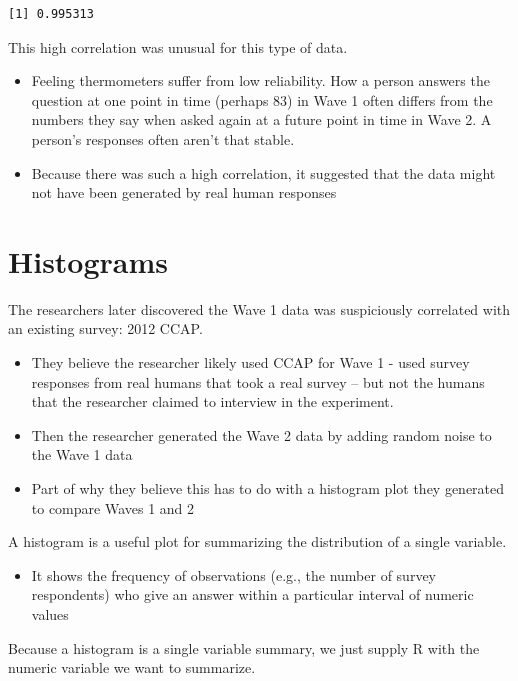\documentclass[
  letterpaper,
  DIV=11,
  numbers=noendperiod]{scrreprt}
\providecommand{\tightlist}{%
  \setlength{\itemsep}{0pt}\setlength{\parskip}{0pt}}\usepackage{longtable,booktabs,array}
\begin{document}
\begin{verbatim}
[1] 0.995313
\end{verbatim}

This high correlation was unusual for this type of data.

\begin{itemize}
\tightlist
\item
  Feeling thermometers suffer from low reliability. How a person answers
  the question at one point in time (perhaps 83) in Wave 1 often differs
  from the numbers they say when asked again at a future point in time
  in Wave 2. A person's responses often aren't that stable.
\item
  Because there was such a high correlation, it suggested that the data
  might not have been generated by real human responses
\end{itemize}

\hypertarget{histograms}{%
\section{Histograms}\label{histograms}}

The researchers later discovered the Wave 1 data was suspiciously
correlated with an existing survey: 2012 CCAP.

\begin{itemize}
\tightlist
\item
  They believe the researcher likely used CCAP for Wave 1 - used survey
  responses from real humans that took a real survey -- but not the
  humans that the researcher claimed to interview in the experiment.
\item
  Then the researcher generated the Wave 2 data by adding random noise
  to the Wave 1 data
\item
  Part of why they believe this has to do with a histogram plot they
  generated to compare Waves 1 and 2
\end{itemize}

A histogram is a useful plot for summarizing the distribution of a
single variable.

\begin{itemize}
\tightlist
\item
  It shows the frequency of observations (e.g., the number of survey
  respondents) who give an answer within a particular interval of
  numeric values
\end{itemize}

Because a histogram is a single variable summary, we just supply R with
the numeric variable we want to summarize.
\end{document}
